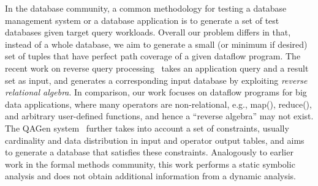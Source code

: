


In the database community, a common methodology for testing a database
management system or a database application is to generate a set of
test databases given target query workloads.  Overall our problem
differs in that, instead of a whole database, we aim to generate a
small (or minimum if desired) set of tuples that have perfect path
coverage of a given dataflow program.  The recent work on reverse
query processing~\cite{binnig07reverse} takes an application query and
a result set as input, and generates a corresponding input database by
exploiting \textit{reverse relational algebra}. In comparison, our
work focuses on dataflow programs for big data applications, where
many operators are non-relational, e.g., map(), reduce(), and
arbitrary user-defined functions, and hence a ``reverse algebra'' may
not exist.  The QAGen system~\cite{BinnigKLO07} further takes into
account a set of constraints, usually cardinality and data
distribution in input and operator output tables, and aims to generate
a database that satisfies these constraints. Analogously to earlier
work in the formal methods community, this work performs a static
symbolic analysis and does not obtain additional information from a
dynamic analysis.
%


